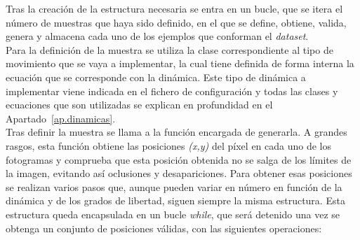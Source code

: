 Tras la creación de la estructura necesaria se entra en un bucle, que se itera el número de muestras que haya sido definido, en el que se define, obtiene, valida, genera y almacena cada uno de los ejemplos que conforman el \textit{dataset}.\\

Para la definición de la muestra se utiliza la clase correspondiente al tipo de movimiento que se vaya a implementar, la cual tiene definida de forma interna la ecuación que se corresponde con la dinámica. Este tipo de dinámica a implementar viene indicada en el fichero de configuración y todas las clases y ecuaciones que son utilizadas se explican en profundidad en el Apartado~\ref{ap.dinamicas}.\\

Tras definir la muestra se llama a la función encargada de generarla. A grandes rasgos, esta función obtiene las posiciones \textit{(x,y)} del píxel en cada uno de los fotogramas y comprueba que esta posición obtenida no se salga de los límites de la imagen, evitando así oclusiones y desapariciones. Para obtener esas posiciones se realizan varios pasos que, aunque pueden variar en número en función de la dinámica y de los grados de libertad, siguen siempre la misma estructura. Esta estructura queda encapsulada en un bucle \textit{while}, que será detenido una vez se obtenga un conjunto de posiciones válidas, con las siguientes operaciones:

